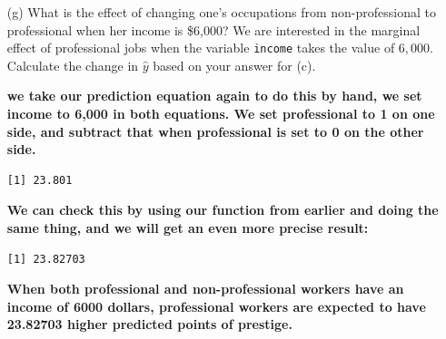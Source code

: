 \documentclass[12pt,letterpaper]{article}
\begin{document}
\begin{enumerate}
	\textbf{we take our prediction equation:}
	\textbf{predicted prestige = 21.142 + (0.00317 x income) + (37.781 x professional) + (-0.00233 x income x professional)}
	\textbf{and by hand we set income to 1,000, set professional to 1, check difference when income is 0}
	
	\begin{verbatim}
		[1] 0.84
	\end{verbatim}
	\textbf{we can also take our function from 1c and check differences in income of 1000}
	
	\begin{verbatim}
		[1] 0.8452
	\end{verbatim}
	\textbf{we can do it again with different numbers just to make sure that it works:}
	
	\begin{verbatim}
		[1] 0.8452
	\end{verbatim}
	
	\textbf{For professional occupations we can see that a 1000 dollar increase in income is associated with an increase in 0.8452 units of predicted prestige}
	
	\item [(g)]
	What is the effect of changing one's occupations from non-professional to professional when her income is \$6,000? We are interested in the marginal effect of professional jobs when the variable \texttt{income} takes the value of $6,000$. Calculate the change in $\hat{y}$ based on your answer for (c).
	
		\textbf{we take our prediction equation again to do this by hand,  we set income to 6,000 in both equations. We set professional to 1 on one side, and subtract that when professional is set to 0 on the other side.}
	
	\begin{verbatim}
[1] 23.801
	\end{verbatim}
	\textbf{We can check this by using our function from earlier and doing the same thing, and we will get an even more precise result:}
		
	\begin{verbatim}
[1] 23.82703
	\end{verbatim}
	\textbf{When both professional and non-professional workers have an income of 6000 dollars, professional workers are expected to have 23.82703 higher predicted points of prestige.}
\end{enumerate}
\end{document}
